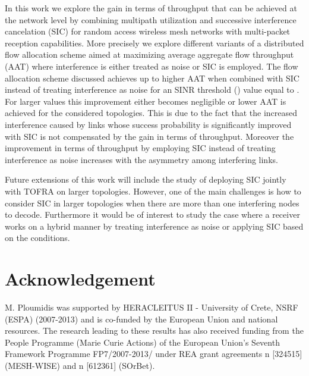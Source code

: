 \documentclass[conference]{IEEEtran}
\begin{document}
In this work we explore the gain in terms of throughput that can be achieved at the network level by combining multipath utilization
and successive interference cancelation (SIC) for random access wireless mesh networks with multi-packet reception capabilities.
More precisely we explore different variants of a distributed flow allocation scheme aimed at maximizing average aggregate flow throughput (AAT)
where interference is either treated as noise or SIC is employed.
The flow allocation scheme discussed achieves up to  higher AAT  when combined with SIC instead of treating interference as noise
for an SINR threshold () value equal to . For larger  values this improvement either becomes negligible or lower AAT
is achieved for the considered topologies. This is due to the fact that the increased interference caused by links whose success probability is significantly
improved with SIC is not compensated by the gain in terms of throughput. Moreover the improvement in terms of throughput by employing SIC instead
of treating interference as noise increases with the asymmetry among interfering links.

Future extensions of this work will include the study of deploying SIC jointly with TOFRA on larger topologies. However, one of the main challenges is
how to consider SIC in larger topologies when there are more than one interfering nodes to decode. Furthermore it would be of interest
to study the case where a receiver works on a hybrid manner by treating interference as noise or applying SIC based on the conditions. 

\section*{Acknowledgement}
M. Ploumidis was supported by HERACLEITUS II - University of Crete, NSRF (ESPA) (2007-2013) and is co-funded by the European Union and national resources.
The research leading to these results has also received funding from the People Programme (Marie Curie Actions) of the European Union's Seventh Framework Programme FP7/2007-2013/ under REA grant agreements n [324515] (MESH-WISE) and n [612361] (SOrBet).



\end{document}
